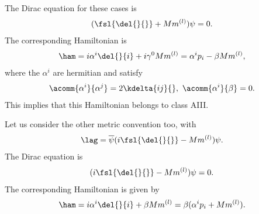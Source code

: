 The Dirac equation for these cases is
\begin{align*}
	(\fsl{\del{}{}} + Mm^{(l)})\psi = 0.
\end{align*}
The corresponding Hamiltonian is
\begin{align*}
	\ham = i\alpha^{i}\del{}{i} + i\gamma^{0}Mm^{(l)} = \alpha^{i}p_{i} - \beta Mm^{(l)},
\end{align*}
where the $\alpha^{i}$ are hermitian and satisfy
\begin{align*}
	\acomm{\alpha^{i}}{\alpha^{j}} = 2\kdelta{ij}{},\ \acomm{\alpha^{i}}{\beta} = 0.
\end{align*}
This implies that this Hamiltonian belongs to class AIII.

Let us consider the other metric convention too, with
\begin{align*}
	\lag = \overline{\psi}(i\fsl{\del{}{}} - Mm^{(l)})\psi.
\end{align*}
The Dirac equation is
\begin{align*}
	(i\fsl{\del{}{}} - Mm^{(l)})\psi = 0.
\end{align*}
The corresponding Hamiltonian is given by
\begin{align*}
	\ham = i\alpha^{i}\del{}{i} + \beta Mm^{(l)} = \beta(\alpha^{i}p_{i} + Mm^{(l)}).
\end{align*}

